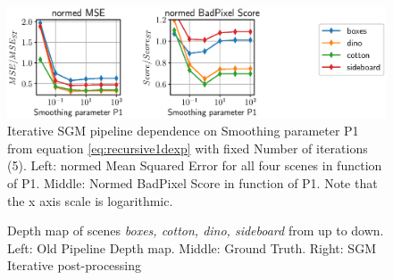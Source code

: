 \documentclass  [
  paper    = a4,
  BCOR     = 10mm,
  twoside,
  fontsize = 12pt,
  fleqn,
  toc      = bibnumbered,
  toc      = listofnumbered,
  numbers  = noendperiod,
  headings = normal,
  listof   = leveldown,
  version  = 3.03
]                                       {scrreprt}
\begin{document}
\begin{figure}
	\centering
	\includegraphics[width=1\linewidth]{images/choose_lower_sgm_ppr_merge_iterations_exp_penalty1}
	\caption[Iterative SGM dependence on Smoothing Parameter ]{Iterative SGM pipeline dependence on Smoothing parameter P1 from equation \ref{eq:recursive1dexp} with fixed Number of iterations (5). Left: normed Mean Squared Error for all four scenes in function of P1. Middle: Normed BadPixel Score in function of P1. Note that the x axis scale is logarithmic.}
	\label{fig:chooselowersgmpprmergeiterationsexppenalty1}
\end{figure}


\begin{figure}
	\centering
	\caption[Iterative SGM Images]{Depth map of scenes \textit{boxes, cotton, dino, sideboard} from up to down. Left: Old Pipeline Depth map. Middle: Ground Truth. Right: SGM Iterative post-processing}
	\label{fig:sgmresultsiterative}
\end{figure}
\end{document}
